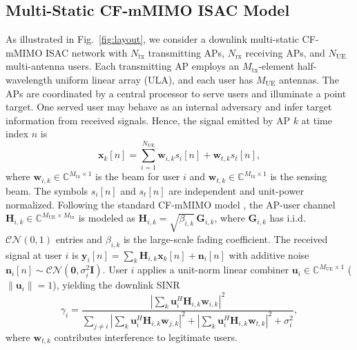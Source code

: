 \documentclass[lettersize,journal]{IEEEtran}
\begin{document}
\subsection{Multi-Static CF-mMIMO ISAC Model}
As illustrated in Fig.~\ref{fig:layout}, we consider a downlink multi-static CF-mMIMO ISAC network with $N_{\mathrm{tx}}$ transmitting APs, $N_{\mathrm{rx}}$ receiving APs, and $N_{\mathrm{UE}}$ multi-antenna users. Each transmitting AP employs an $M_{\mathrm{tx}}$-element half-wavelength uniform linear array (ULA), and each user has $M_{\mathrm{UE}}$ antennas. The APs are coordinated by a central processor to serve users and illuminate a point target. One served user may behave as an internal adversary and infer target information from received signals. Hence, the signal emitted by AP $k$ at time index $n$ is
\begin{equation}
\mathbf{x}_k[n]=\sum_{i=1}^{N_{\mathrm{UE}}}\mathbf{w}_{i,k}s_i[n]+\mathbf{w}_{t,k}s_t[n],
\label{eq:xk}
\end{equation}
where $\mathbf{w}_{i,k}\in\mathbb{C}^{M_{\mathrm{tx}}\times 1}$ is the beam for user $i$ and $\mathbf{w}_{t,k}\in\mathbb{C}^{M_{\mathrm{tx}}\times 1}$ is the sensing beam.
The symbols $s_i[n]$ and $s_t[n]$ are independent and unit-power normalized.
Following the standard CF-mMIMO model \cite{ngo2017cellfree}, the AP-user channel $\mathbf{H}_{i,k}\in\mathbb{C}^{M_{\mathrm{UE}}\times M_{\mathrm{tx}}}$ is modeled as $\mathbf{H}_{i,k}=\sqrt{\beta_{i,k}}\,\mathbf{G}_{i,k}$, where $\mathbf{G}_{i,k}$ has i.i.d. $\mathcal{CN}(0,1)$ entries and $\beta_{i,k}$ is the large-scale fading coefficient. The received signal at user $i$ is $\mathbf{y}_i[n]=\sum_k\mathbf{H}_{i,k}\mathbf{x}_k[n]+\mathbf{n}_i[n]$ with additive noise $\mathbf{n}_i[n]\sim\mathcal{CN}(\mathbf{0},\sigma_i^2\mathbf{I})$. User $i$ applies a unit-norm linear combiner $\mathbf{u}_i\in\mathbb{C}^{M_{\mathrm{UE}}\times 1}$ ($\|\mathbf{u}_i\|=1$), yielding the downlink SINR
\begin{equation}
\gamma_i=
\frac{\left|\sum_{k}\mathbf{u}_i^H\mathbf{H}_{i,k}\mathbf{w}_{i,k}\right|^2}{\sum_{j\neq i}\left|\sum_{k}\mathbf{u}_i^H\mathbf{H}_{i,k}\mathbf{w}_{j,k}\right|^2+\left|\sum_{k}\mathbf{u}_i^H\mathbf{H}_{i,k}\mathbf{w}_{t,k}\right|^2+\sigma_i^2},
\label{eq:sinr-user}
\end{equation}
where $\mathbf{w}_{t,k}$ contributes interference to legitimate users.
\end{document}
